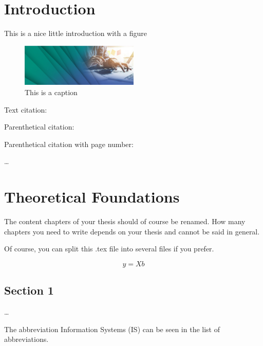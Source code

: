 
\chapter{Introduction}
\label{ch:Introduction}

This is a nice little introduction with a figure
\begin{figure}[htp]
\begin{center}
  \includegraphics[width = 0.5\textwidth]{figures/KITHeaderImage.png}
\caption{This is a caption}
\end{center}
\end{figure} 

Text citation: \citet{vombrocke2020special}

Parenthetical citation: \citep{vombrocke2020special}

Parenthetical citation with page number: \citep[p.~4711]{vombrocke2020special}

\dots

\chapter{Theoretical Foundations}
\label{ch:Foundations}

The content chapters of your thesis should of course be renamed. How many chapters you need to write depends on your thesis and cannot be said in general. 

Of course, you can split this .tex file into several files if you prefer. 

\begin{equation}
    y = Xb
\end{equation}


\section{Section 1}
\label{ch:Foundations:sec:Section1}

\dots

The abbreviation Information Systems (IS)  can be seen in the list of abbreviations.




